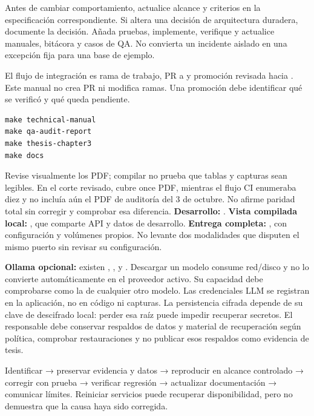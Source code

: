 Antes de cambiar comportamiento, actualice alcance y criterios en la especificación correspondiente. Si altera una decisión de arquitectura duradera, documente la decisión. Añada pruebas, implemente, verifique y actualice manuales, bitácora y casos de QA. No convierta un incidente aislado en una excepción fija para una base de ejemplo.

El flujo de integración es rama de trabajo, PR a  y promoción revisada hacia . Este manual no crea PR ni modifica ramas. Una promoción debe identificar qué se verificó y qué queda pendiente.
\begin{verbatim}
make technical-manual
make qa-audit-report
make thesis-chapter3
make docs
\end{verbatim}
Revise visualmente los PDF; compilar no prueba que tablas y capturas sean legibles. En el corte revisado,  cubre once PDF, mientras el flujo CI enumeraba diez y no incluía aún el PDF de auditoría del 3 de octubre. No afirme paridad total sin corregir y comprobar esa diferencia.
\textbf{Desarrollo:} . \textbf{Vista compilada local:} , que comparte API y datos de desarrollo. \textbf{Entrega completa:} , con configuración y volúmenes propios. No levante dos modalidades que disputen el mismo puerto sin revisar su configuración.

\textbf{Ollama opcional:} existen , ,  y . Descargar un modelo consume red/disco y no lo convierte automáticamente en el proveedor activo. Su capacidad debe comprobarse como la de cualquier otro modelo.
Las credenciales LLM se registran en la aplicación, no en código ni capturas. La persistencia cifrada depende de su clave de descifrado local: perder esa raíz puede impedir recuperar secretos. El responsable debe conservar respaldos de datos y material de recuperación según política, comprobar restauraciones y no publicar esos respaldos como evidencia de tesis.
\begin{good}
Identificar → preservar evidencia y datos → reproducir en alcance controlado → corregir con prueba → verificar regresión → actualizar documentación → comunicar límites. Reiniciar servicios puede recuperar disponibilidad, pero no demuestra que la causa haya sido corregida.
\end{good}
